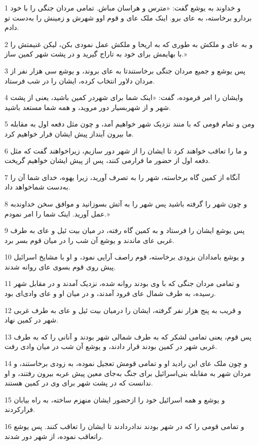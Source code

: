 \par 1 و خداوند به یوشع گفت: «مترس و هراسان مباش. تمامی مردان جنگی را با خود بردارو برخاسته، به عای برو. اینک ملک عای و قوم اوو شهرش و زمینش را به‌دست تو دادم.
\par 2 و به عای و ملکش به طوری که به اریحا و ملکش عمل نمودی بکن، لیکن غنیمتش را با بهایمش برای خود به تاراج گیرید و در پشت شهر کمین ساز.»
\par 3 پس یوشع و جمیع مردان جنگی برخاستندتا به عای بروند، و یوشع سی هزار نفر از مردان دلاور انتخاب کرده، ایشان را در شب فرستاد.
\par 4 وایشان را امر فرموده، گفت: «اینک شما برای شهردر کمین باشید، یعنی از پشت شهر و از شهربسیار دور مروید، و همه شما مستعد باشید.
\par 5 ومن و تمام قومی که با منند نزدیک شهر خواهیم آمد، و چون مثل دفعه اول به مقابله ما بیرون آینداز پیش ایشان فرار خواهیم کرد.
\par 6 و ما را تعاقب خواهند کرد تا ایشان را از شهر دور سازیم، زیراخواهند گفت که مثل دفعه اول از حضور ما فرارمی کنند، پس از پیش ایشان خواهیم گریخت.
\par 7 آنگاه از کمین گاه برخاسته، شهر را به تصرف آورید، زیرا یهوه، خدای شما آن را به‌دست شماخواهد داد.
\par 8 و چون شهر را گرفته باشید پس شهر را به آتش بسوزانید و موافق سخن خداوندبه عمل آورید. اینک شما را امر نمودم.»
\par 9 پس یوشع ایشان را فرستاد و به کمین گاه رفته، در میان بیت ئیل و عای به طرف غربی عای ماندند و یوشع آن شب را در میان قوم بسر برد.
\par 10 و یوشع بامدادان بزودی برخاسته، قوم راصف آرایی نمود، و او با مشایخ اسرائیل پیش روی قوم بسوی عای روانه شدند.
\par 11 و تمامی مردان جنگی که با وی بودند روانه شده، نزدیک آمدند و در مقابل شهر رسیده، به طرف شمال عای فرود آمدند، و در میان او و عای وادی‌ای بود.
\par 12 و قریب به پنج هزار نفر گرفته، ایشان را درمیان بیت ئیل و عای به طرف غربی شهر در کمین نهاد.
\par 13 پس قوم، یعنی تمامی لشکر که به طرف شمالی شهر بودند و آنانی را که به طرف غربی شهر در کمین بودند قرار دادند، و یوشع آن شب در میان وادی رفت.
\par 14 و چون ملک عای این رادید او و تمامی قومش تعجیل نموده، به زودی برخاستند، و مردان شهر به مقابله بنی‌اسرائیل برای جنگ به‌جای معین پیش عربه بیرون رفتند، و او ندانست که در پشت شهر برای وی در کمین هستند.
\par 15 و یوشع و همه اسرائیل خود را ازحضور ایشان منهزم ساخته، به راه بیابان فرارکردند.
\par 16 و تمامی قومی را که در شهر بودند ندادر‌دادند تا ایشان را تعاقب کنند. پس یوشع راتعاقب نموده، از شهر دور شدند.
